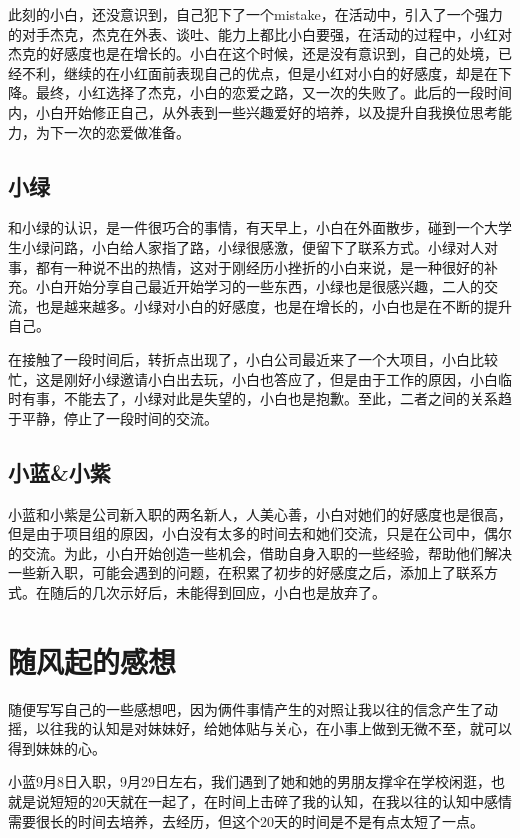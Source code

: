 \documentclass{article}
\begin{document}
此刻的小白，还没意识到，自己犯下了一个mistake，在活动中，引入了一个强力的对手杰克，杰克在外表、谈吐、能力上都比小白要强，在活动的过程中，小红对杰克的好感度也是在增长的。小白在这个时候，还是没有意识到，自己的处境，已经不利，继续的在小红面前表现自己的优点，但是小红对小白的好感度，却是在下降。最终，小红选择了杰克，小白的恋爱之路，又一次的失败了。此后的一段时间内，小白开始修正自己，从外表到一些兴趣爱好的培养，以及提升自我换位思考能力，为下一次的恋爱做准备。

\subsection{小绿}

和小绿的认识，是一件很巧合的事情，有天早上，小白在外面散步，碰到一个大学生小绿问路，小白给人家指了路，小绿很感激，便留下了联系方式。小绿对人对事，都有一种说不出的热情，这对于刚经历小挫折的小白来说，是一种很好的补充。小白开始分享自己最近开始学习的一些东西，小绿也是很感兴趣，二人的交流，也是越来越多。小绿对小白的好感度，也是在增长的，小白也是在不断的提升自己。

在接触了一段时间后，转折点出现了，小白公司最近来了一个大项目，小白比较忙，这是刚好小绿邀请小白出去玩，小白也答应了，但是由于工作的原因，小白临时有事，不能去了，小绿对此是失望的，小白也是抱歉。至此，二者之间的关系趋于平静，停止了一段时间的交流。

\subsection{小蓝\&小紫}

小蓝和小紫是公司新入职的两名新人，人美心善，小白对她们的好感度也是很高，但是由于项目组的原因，小白没有太多的时间去和她们交流，只是在公司中，偶尔的交流。为此，小白开始创造一些机会，借助自身入职的一些经验，帮助他们解决一些新入职，可能会遇到的问题，在积累了初步的好感度之后，添加上了联系方式。在随后的几次示好后，未能得到回应，小白也是放弃了。

\section{随风起的感想}

随便写写自己的一些感想吧，因为俩件事情产生的对照让我以往的信念产生了动摇，以往我的认知是对妹妹好，给她体贴与关心，在小事上做到无微不至，就可以得到妹妹的心。

小蓝9月8日入职，9月29日左右，我们遇到了她和她的男朋友撑伞在学校闲逛，也就是说短短的20天就在一起了，在时间上击碎了我的认知，在我以往的认知中感情需要很长的时间去培养，去经历，但这个20天的时间是不是有点太短了一点。
\end{document}
